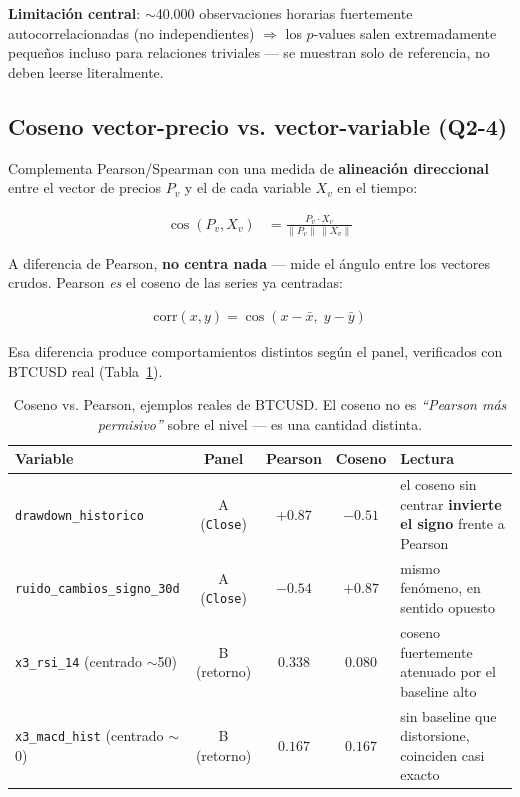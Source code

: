 \documentclass[11pt,a4paper]{article}
\newcommand{\code}[1]{\texttt{\small #1}}
\newcommand{\dq}[1]{\emph{``#1''}}
\begin{document}
\textbf{Limitación central}: \(\sim\)40.000 observaciones horarias fuertemente
autocorrelacionadas (no independientes) \(\Rightarrow\) los \(p\)-values salen
extremadamente pequeños incluso para relaciones triviales — se muestran solo de
referencia, no deben leerse literalmente.

\subsection{Coseno vector-precio vs. vector-variable (Q2-4)}
\label{ssec:coseno}

Complementa Pearson/Spearman con una medida de \textbf{alineación direccional} entre el
vector de precios \(P_v\) y el de cada variable \(X_v\) en el tiempo:

\begin{align}
\cos(P_v, X_v) &= \frac{P_v \cdot X_v}{\|P_v\|\,\|X_v\|}
\end{align}

A diferencia de Pearson, \textbf{no centra nada} — mide el ángulo entre los vectores
crudos. Pearson \emph{es} el coseno de las series ya centradas:

\begin{align}
\mathrm{corr}(x,y) = \cos(x - \bar{x},\; y - \bar{y})
\end{align}

Esa diferencia produce comportamientos distintos según el panel, verificados con BTCUSD
real (Tabla~\ref{tab:coseno-ejemplo}).

\begin{table}[h]
\centering
\small
\begin{tabularx}{\linewidth}{@{}X c c c X@{}}
\toprule
\textbf{Variable} & \textbf{Panel} & \textbf{Pearson} & \textbf{Coseno} & \textbf{Lectura} \\
\midrule
\code{drawdown\_historico} & A (\code{Close}) & \(+0.87\) & \(-0.51\) & el coseno sin
  centrar \textbf{invierte el signo} frente a Pearson \\
\code{ruido\_cambios\_signo\_30d} & A (\code{Close}) & \(-0.54\) & \(+0.87\) & mismo
  fenómeno, en sentido opuesto \\
\code{x3\_rsi\_14} (centrado \(\sim\)50) & B (retorno) & \(0.338\) & \(0.080\) & coseno
  fuertemente atenuado por el baseline alto \\
\code{x3\_macd\_hist} (centrado \(\sim\)0) & B (retorno) & \(0.167\) & \(0.167\) & sin
  baseline que distorsione, coinciden casi exacto \\
\bottomrule
\end{tabularx}
\caption{Coseno vs. Pearson, ejemplos reales de BTCUSD. El coseno no es \dq{Pearson más
permisivo} sobre el nivel — es una cantidad distinta.}
\label{tab:coseno-ejemplo}
\end{table}
\end{document}
